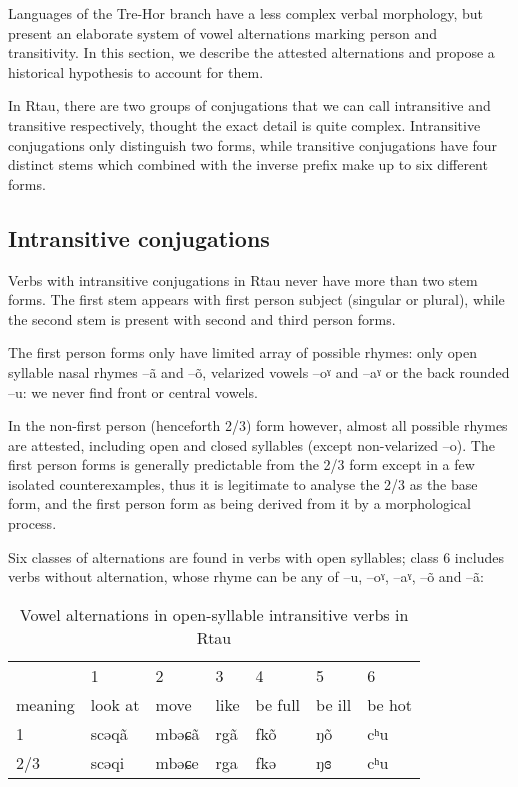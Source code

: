 \documentclass[oldfontcommands,oneside,a4paper,11pt]{article}
\newcommand{\ipa}[1]{{\phon #1}} %
\begin{document}
Languages of the Tre-Hor branch   have a less complex verbal morphology, but present an elaborate system of vowel alternations marking person and transitivity. In this section, we describe the attested alternations and propose a historical hypothesis to account for them.

In Rtau, there are two groups of conjugations that we can call intransitive and transitive respectively, thought the exact detail is quite complex. Intransitive conjugations only distinguish two forms, while transitive conjugations have four distinct stems which combined with the inverse prefix make up to six different forms.

\subsection{Intransitive conjugations}
Verbs with intransitive conjugations in Rtau never have more than two stem forms. The first stem appears with first person subject (singular or plural), while the second stem is present with second and third person forms.

The first person forms only have limited array of possible rhymes: only open syllable nasal rhymes --\ipa{ã} and --\ipa{õ}, velarized vowels --\ipa{oˠ} and --\ipa{aˠ} or the back rounded --\ipa{u}: we never find front or central vowels.

In the non-first person  (henceforth 2/3)  form however, almost all possible rhymes are attested, including open and closed syllables (except non-velarized --\ipa{o}). The first person forms is generally predictable from the 2/3 form except in a few isolated counterexamples, thus it is legitimate to analyse the 2/3 as the base form, and the first person form as being derived from it by a morphological process.
 
 
Six classes of alternations are found in verbs with open syllables; class 6 includes verbs without alternation, whose rhyme can be any of --\ipa{u}, --\ipa{oˠ}, --\ipa{aˠ}, --\ipa{õ} and --\ipa{ã}:
\begin{table}[H]
\caption{Vowel alternations in open-syllable intransitive verbs in Rtau} \label{tab:open.intr} \centering
\begin{tabular}{llll|ll|l}
\toprule
&1&2&3&4&5&6 \\
meaning &	look at   &  	move   &  	like&  	be full     &  	 	be ill      &  	be hot       \\  
\midrule
1&	\ipa{scəqã} & 	\ipa{mbəɕã} & \ipa{rgã} &	\ipa{fkõ} & 	  	\ipa{ŋõ} & 	   	\ipa{cʰu}   \\ 
2/3&	\ipa{scəqi} & 	\ipa{mbəɕe} & \ipa{rga} & 	\ipa{fkə} & 	  	\ipa{ŋɞ} & 	 	\ipa{cʰu}  \\ 
\bottomrule
\end{tabular}
\end{table}
\end{document}
